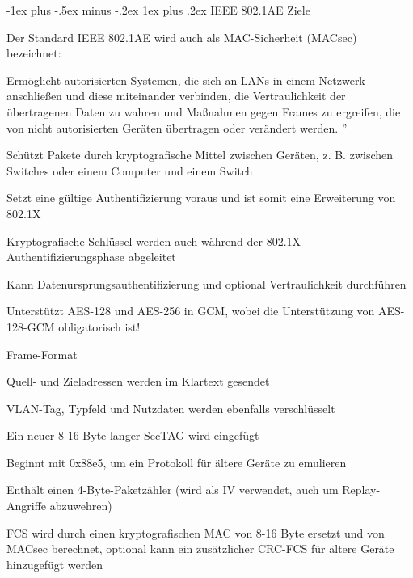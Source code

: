 \documentclass[a4paper]{article}
\makeatletter
\renewcommand{\subsubsection}{\@startsection{subsubsection}{3}{0mm}%
 {-1ex plus -.5ex minus -.2ex}%
 {1ex plus .2ex}%
 {\normalfont\small\bfseries}}
\makeatother
\begin{document}
\begin{multicols}{3}
      \subsubsection{IEEE 802.1AE}
      Ziele
      \begin{itemize*}
            \item Der Standard IEEE 802.1AE wird auch als MAC-Sicherheit (MACsec) bezeichnet:
            \begin{itemize*}
                  \item Ermöglicht autorisierten Systemen, die sich an LANs in einem Netzwerk anschließen und diese miteinander verbinden, die Vertraulichkeit der übertragenen Daten zu wahren und Maßnahmen gegen Frames zu ergreifen, die von nicht autorisierten Geräten übertragen oder verändert werden. ''
                  \item Schützt Pakete durch kryptografische Mittel zwischen Geräten, z. B. zwischen Switches oder einem Computer und einem Switch
                  \item Setzt eine gültige Authentifizierung voraus und ist somit eine Erweiterung von 802.1X
                  \item Kryptografische Schlüssel werden auch während der 802.1X-Authentifizierungsphase abgeleitet
                  \item Kann Datenursprungsauthentifizierung und optional Vertraulichkeit durchführen
                  \item Unterstützt AES-128 und AES-256 in GCM, wobei die Unterstützung von AES-128-GCM obligatorisch ist!
            \end{itemize*}
      \end{itemize*}

      Frame-Format
      \begin{itemize*}
            \item Quell- und Zieladressen werden im Klartext gesendet
            \item VLAN-Tag, Typfeld und Nutzdaten werden ebenfalls verschlüsselt
            \item Ein neuer 8-16 Byte langer SecTAG wird eingefügt
            \begin{itemize*}
                  \item Beginnt mit 0x88e5, um ein Protokoll für ältere Geräte zu emulieren
                  \item Enthält einen 4-Byte-Paketzähler (wird als IV verwendet, auch um Replay-Angriffe abzuwehren)
            \end{itemize*}
            \item FCS wird durch einen kryptografischen MAC von 8-16 Byte ersetzt und von MACsec berechnet, optional kann ein zusätzlicher CRC-FCS für ältere Geräte hinzugefügt werden
      \end{itemize*}


\end{multicols}
\end{document}
